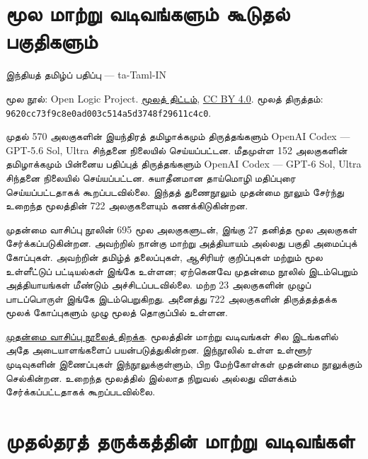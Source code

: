 \documentclass[11pt,a4paper,openany]{memoir}
\begin{document}
\raggedright
\pagestyle{plain}
\chapter*{மூல மாற்று வடிவங்களும் கூடுதல் பகுதிகளும்}
\noindent இந்தியத் தமிழ்ப் பதிப்பு — ta-Taml-IN

\noindent மூல நூல்: Open Logic Project.
\href{https://github.com/OpenLogicProject/OpenLogic}{மூலத் திட்டம்},
\href{https://creativecommons.org/licenses/by/4.0/}{CC BY 4.0}.
மூலத் திருத்தம்: \texttt{9620cc73f9c8e0ad003c514a5d3748f29611c4c0}.

\noindent முதல் 570 அலகுகளின் இயந்திரத் தமிழாக்கமும் திருத்தங்களும்
OpenAI Codex — GPT-5.6 Sol, Ultra சிந்தனை நிலையில் செய்யப்பட்டன.
மீதமுள்ள 152 அலகுகளின் தமிழாக்கமும் பின்னைய பதிப்புத் திருத்தங்களும்
OpenAI Codex — GPT-6 Sol, Ultra சிந்தனை நிலையில் செய்யப்பட்டன.
சுயாதீனமான தாய்மொழி மதிப்புரை செய்யப்பட்டதாகக் கூறப்படவில்லை.
இந்தத் துணைநூலும் முதன்மை நூலும்
சேர்ந்து உறைந்த மூலத்தின் 722 அலகுகளையும் கணக்கிடுகின்றன.

\noindent முதன்மை வாசிப்பு நூலின் 695 மூல அலகுகளுடன்,
இங்கு 27 தனித்த மூல அலகுகள் சேர்க்கப்படுகின்றன.
அவற்றில் நான்கு மாற்று அத்தியாயம் அல்லது பகுதி அமைப்புக் கோப்புகள்.
அவற்றின் தமிழ்த் தலைப்புகள், ஆசிரியர் குறிப்புகள் மற்றும் மூல
உள்ளீட்டுப் பட்டியல்கள் இங்கே உள்ளன; ஏற்கெனவே முதன்மை நூலில்
இடம்பெறும் அத்தியாயங்கள் மீண்டும் அச்சிடப்படவில்லை.
மற்ற 23 அலகுகளின் முழுப் பாடப்பொருள் இங்கே இடம்பெறுகிறது.
அனைத்து 722 அலகுகளின் திருத்தத்தக்க மூலக் கோப்புகளும்
முழு மூலத் தொகுப்பில் உள்ளன.

\noindent \href{tamil-complete.pdf}{முதன்மை வாசிப்பு நூலைத் திறக்க}.
மூலத்தின் மாற்று வடிவங்கள் சில இடங்களில் அதே அடையாளங்களைப்
பயன்படுத்துகின்றன. இந்நூலில் உள்ள உள்ளூர் முடிவுகளின் இணைப்புகள்
இந்நூலுக்குள்ளும், பிற மேற்கோள்கள் முதன்மை நூலுக்கும் செல்கின்றன.
உறைந்த மூலத்தில் இல்லாத நிறுவல் அல்லது விளக்கம் சேர்க்கப்பட்டதாகக்
கூறப்படவில்லை.

\clearpage
\begingroup
\sloppy
\renewcommand{\cftsectionfont}{\small}
\tableofcontents*
\endgroup
\chapter{முதல்தரத் தருக்கத்தின் மாற்று வடிவங்கள்}
\end{document}
